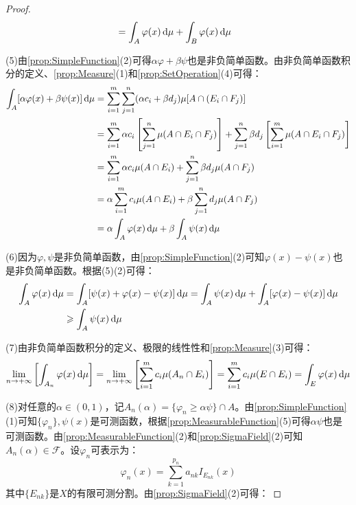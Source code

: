 \begin{proof}
\begin{align*}
		&=\int_{A}\varphi(x)\mathop{}\!\mathrm{d}\mu+\int_{B}\varphi(x)\mathop{}\!\mathrm{d}\mu
	\end{align*}\par
	(5)由\cref{prop:SimpleFunction}(2)可得$\alpha\varphi+\beta\psi$也是非负简单函数。由非负简单函数积分的定义、\cref{prop:Measure}(1)和\cref{prop:SetOperation}(4)可得：
	\begin{align*}
		\int_{A}[\alpha\varphi(x)+\beta\psi(x)]\mathop{}\!\mathrm{d}\mu
		&=\sum_{i=1}^{m}\sum_{j=1}^{n}(\alpha c_i+\beta d_j)\mu[A\cap (E_i\cap F_j)] \\
		&=\sum_{i=1}^{m}\alpha c_i\left[\sum_{j=1}^{n}\mu(A\cap E_i\cap F_j)\right]+\sum_{j=1}^{n}\beta d_j\left[\sum_{i=1}^{m}\mu(A\cap E_i\cap F_j)\right] \\
		&=\sum_{i=1}^{m}\alpha c_i\mu(A\cap E_i)+\sum_{j=1}^{n}\beta d_j\mu(A\cap F_j) \\ 
		&=\alpha\sum_{i=1}^{m}c_i\mu(A\cap E_i)+\beta\sum_{j=1}^{n}d_j\mu(A\cap F_j) \\
		&=\alpha\int_{A}\varphi(x)\mathop{}\!\mathrm{d}\mu+\beta\int_{A}\psi(x)\mathop{}\!\mathrm{d}\mu
	\end{align*}\par
	(6)因为$\varphi,\psi$是非负简单函数，由\cref{prop:SimpleFunction}(2)可知$\varphi(x)-\psi(x)$也是非负简单函数。根据(5)(2)可得：
	\begin{align*}
		\int_{A}\varphi(x)\mathop{}\!\mathrm{d}\mu&=\int_{A}[\psi(x)+\varphi(x)-\psi(x)]\mathop{}\!\mathrm{d}\mu=\int_{A}\psi(x)\mathop{}\!\mathrm{d}\mu+\int_{A}[\varphi(x)-\psi(x)]\mathop{}\!\mathrm{d}\mu \\
		&\geqslant\int_{A}\psi(x)\mathop{}\!\mathrm{d}\mu
	\end{align*}\par
	(7)由非负简单函数积分的定义、极限的线性性和\cref{prop:Measure}(3)可得：
	\begin{equation*}
		\lim_{n\to+\infty}\left[\int_{A_n}\varphi(x)\mathop{}\!\mathrm{d}\mu\right]
		=\lim_{n\to+\infty}\left[\sum_{i=1}^{m}c_i\mu(A_n\cap E_i)\right]
		=\sum_{i=1}^{m}c_i\mu(E\cap E_i)
		=\int_{E}\varphi(x)\mathop{}\!\mathrm{d}\mu
	\end{equation*}\par
	(8)对任意的$\alpha\in(0,1)$，记$A_n(\alpha)=\{\varphi_n\geqslant\alpha\psi\}\cap  A$。由\cref{prop:SimpleFunction}(1)可知$\{\varphi_n\},\psi(x)$是可测函数，根据\cref{prop:MeasurableFunction}(5)可得$\alpha\psi$也是可测函数。由\cref{prop:MeasurableFunction}(2)和\cref{prop:SigmaField}(2)可知$A_n(\alpha)\in \mathscr{F}$。设$\varphi_n$可表示为：
	\begin{equation*}
		\varphi_n(x)=\sum_{k=1}^{p_n}a_{nk}I_{E_{nk}}(x)
	\end{equation*}
	其中$\{E_{nk}\}$是$X$的有限可测分割。由\cref{prop:SigmaField}(2)可得：

\end{proof}
